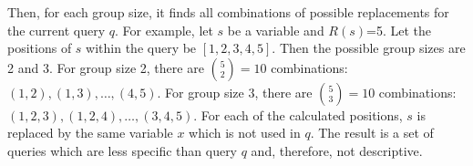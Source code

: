 Then, for each group size, it finds all combinations of possible replacements for the current query $q$.
For example, let $s$ be a variable and $R(s)$=5. Let the positions of $s$
within the query be $[1,2,3,4,5]$.
Then the possible group sizes are 2 and 3.
For group size 2, there are $\binom{5}{2}=10$ combinations: $
(1,2),(1,3),\dots, (4,5)$.
For group size 3, there are $\binom{5}{3}=10$ combinations: $
(1,2,3),(1,2,4),\dots, (3,4,5)$.
For each of the calculated positions, $s$ is replaced by the same variable $x$ which is not
used in $q$.
The result is a set of
queries which are less specific than query $q$ and, therefore, not
descriptive.
